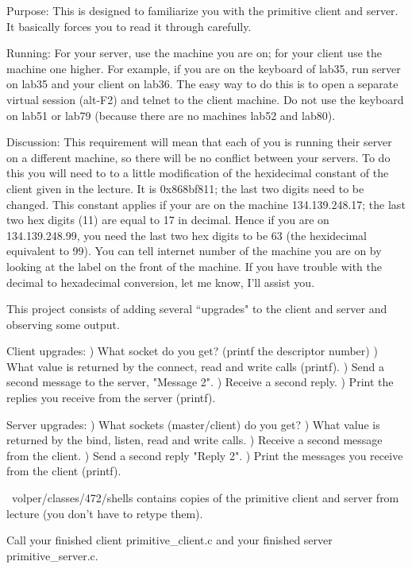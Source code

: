 

\parindent 0pt

Purpose: This is designed to familiarize you with the primitive client
and server. It basically forces you to read it through carefully.

Running: For your server, use the machine you are on;
for your client use the machine one higher.
For example, if you are on the keyboard of lab35, run server on
lab35 and your client on lab36.
The easy way to do this is to open a separate virtual session
(alt-F2) and telnet to the client machine.
Do not use the keyboard on lab51 or lab79 (because there are no
machines lab52 and lab80).

Discussion: This requirement will mean that each of you is running
their server on a different machine, so there will be no conflict
between your servers.
To do this you will need to to a little modification of the
hexidecimal constant of the client given in the lecture.
It is 0x868bf811; the last two digits need to be changed.
This constant applies if your are on the machine 134.139.248.17;
the last two hex digits (11) are equal to 17 in decimal.
Hence if you are on 134.139.248.99, you need the last two hex digits
to be 63 (the hexidecimal equivalent to 99).
You can tell internet number of the machine you are on by looking at the label
on the front of the machine.
If you have trouble with the decimal to hexadecimal conversion, let me
know, I'll assist you.

This project consists of adding several ``upgrades" to the client and
server and observing some output.

Client upgrades:
\hfill{}) What socket do you get? (printf the descriptor number)
\hfill{}) What value is returned by the connect, read and write calls (printf).
\hfill{}) Send a second message to the server, {\ltt{}"Message 2"}.
\hfill{}) Receive a second reply.
\hfill{}) Print the replies you receive from the server (printf).

Server upgrades:
\hfill{}) What sockets (master/client) do you get?
\hfill{}) What value is returned by the bind, listen, read and write calls.
\hfill{}) Receive a second message from the client.
\hfill{}) Send a second reply {\ltt{}"Reply 2"}.
\hfill{}) Print the messages you receive from the client (printf).

{\ltt{}~volper/classes/472/shells} contains copies
of the primitive client and server from lecture
(you don't have to retype them).

Call your finished client {\ltt{}primitive_client.c} and 
your finished server {\ltt{}primitive_server.c}.
\bye
